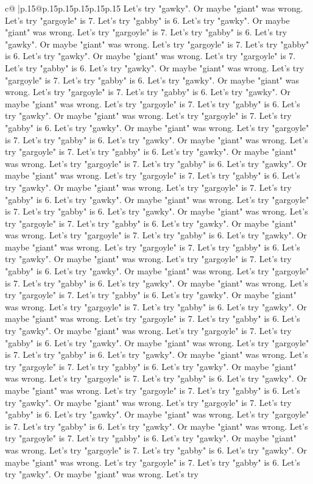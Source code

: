 \documentclass{article}
\begin{document}
{\begin{supertabular}{c@{$\;$}|p{.15\linewidth}@{}p{.15\linewidth}p{.15\linewidth}p{.15\linewidth}p{.15\linewidth}p{.15\linewidth}}
{{{Let's try "gawky". Or maybe "giant" was wrong. Let's try "gargoyle" is 7. Let's try "gabby" is 6. Let's try "gawky". Or maybe "giant" was wrong. Let's try "gargoyle" is 7. Let's try "gabby" is 6. Let's try "gawky". Or maybe "giant" was wrong. Let's try "gargoyle" is 7. Let's try "gabby" is 6. Let's try "gawky". Or maybe "giant" was wrong. Let's try "gargoyle" is 7. Let's try "gabby" is 6. Let's try "gawky". Or maybe "giant" was wrong. Let's try "gargoyle" is 7. Let's try "gabby" is 6. Let's try "gawky". Or maybe "giant" was wrong. Let's try "gargoyle" is 7. Let's try "gabby" is 6. Let's try "gawky". Or maybe "giant" was wrong. Let's try "gargoyle" is 7. Let's try "gabby" is 6. Let's try "gawky". Or maybe "giant" was wrong. Let's try "gargoyle" is 7. Let's try "gabby" is 6. Let's try "gawky". Or maybe "giant" was wrong. Let's try "gargoyle" is 7. Let's try "gabby" is 6. Let's try "gawky". Or maybe "giant" was wrong. Let's try "gargoyle" is 7. Let's try "gabby" is 6. Let's try "gawky". Or maybe "giant" was wrong. Let's try "gargoyle" is 7. Let's try "gabby" is 6. Let's try "gawky". Or maybe "giant" was wrong. Let's try "gargoyle" is 7. Let's try "gabby" is 6. Let's try "gawky". Or maybe "giant" was wrong. Let's try "gargoyle" is 7. Let's try "gabby" is 6. Let's try "gawky". Or maybe "giant" was wrong. Let's try "gargoyle" is 7. Let's try "gabby" is 6. Let's try "gawky". Or maybe "giant" was wrong. Let's try "gargoyle" is 7. Let's try "gabby" is 6. Let's try "gawky". Or maybe "giant" was wrong. Let's try "gargoyle" is 7. Let's try "gabby" is 6. Let's try "gawky". Or maybe "giant" was wrong. Let's try "gargoyle" is 7. Let's try "gabby" is 6. Let's try "gawky". Or maybe "giant" was wrong. Let's try "gargoyle" is 7. Let's try "gabby" is 6. Let's try "gawky". Or maybe "giant" was wrong. Let's try "gargoyle" is 7. Let's try "gabby" is 6. Let's try "gawky". Or maybe "giant" was wrong. Let's try "gargoyle" is 7. Let's try "gabby" is 6. Let's try "gawky". Or maybe "giant" was wrong. Let's try "gargoyle" is 7. Let's try "gabby" is 6. Let's try "gawky". Or maybe "giant" was wrong. Let's try "gargoyle" is 7. Let's try "gabby" is 6. Let's try "gawky". Or maybe "giant" was wrong. Let's try "gargoyle" is 7. Let's try "gabby" is 6. Let's try "gawky". Or maybe "giant" was wrong. Let's try "gargoyle" is 7. Let's try "gabby" is 6. Let's try "gawky". Or maybe "giant" was wrong. Let's try "gargoyle" is 7. Let's try "gabby" is 6. Let's try "gawky". Or maybe "giant" was wrong. Let's try "gargoyle" is 7. Let's try "gabby" is 6. Let's try "gawky". Or maybe "giant" was wrong. Let's try "gargoyle" is 7. Let's try "gabby" is 6. Let's try "gawky". Or maybe "giant" was wrong. Let's try "gargoyle" is 7. Let's try "gabby" is 6. Let's try "gawky". Or maybe "giant" was wrong. Let's try "gargoyle" is 7. Let's try "gabby" is 6. Let's try "gawky". Or maybe "giant" was wrong. Let's try "gargoyle" is 7. Let's try "gabby" is 6. Let's try "gawky". Or maybe "giant" was wrong. Let's try "gargoyle" is 7. Let's try "gabby" is 6. Let's try "gawky". Or maybe "giant" was wrong. Let's try "gargoyle" is 7. Let's try "gabby" is 6. Let's try "gawky". Or maybe "giant" was wrong. Let's try }}}
\end{supertabular}}
\end{document}
